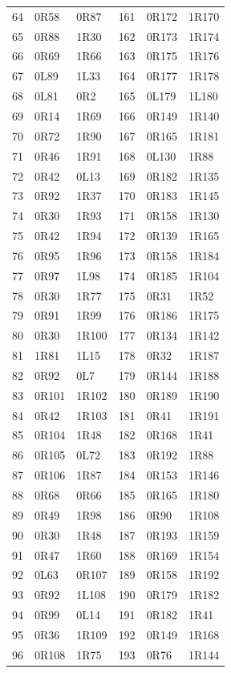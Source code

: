 {\begin{longtable}{@{}rll@{\qquad}rll@{}}
64 & 0R58 & 0R87 & 161 & 0R172 & 1R170\\
65 & 0R88 & 1R30 & 162 & 0R173 & 1R174\\
66 & 0R69 & 1R66 & 163 & 0R175 & 1R176\\
67 & 0L89 & 1L33 & 164 & 0R177 & 1R178\\
68 & 0L81 & 0R2 & 165 & 0L179 & 1L180\\
69 & 0R14 & 1R69 & 166 & 0R149 & 1R140\\
70 & 0R72 & 1R90 & 167 & 0R165 & 1R181\\
71 & 0R46 & 1R91 & 168 & 0L130 & 1R88\\
72 & 0R42 & 0L13 & 169 & 0R182 & 1R135\\
73 & 0R92 & 1R37 & 170 & 0R183 & 1R145\\
74 & 0R30 & 1R93 & 171 & 0R158 & 1R130\\
75 & 0R42 & 1R94 & 172 & 0R139 & 1R165\\
76 & 0R95 & 1R96 & 173 & 0R158 & 1R184\\
77 & 0R97 & 1L98 & 174 & 0R185 & 1R104\\
78 & 0R30 & 1R77 & 175 & 0R31 & 1R52\\
79 & 0R91 & 1R99 & 176 & 0R186 & 1R175\\
80 & 0R30 & 1R100 & 177 & 0R134 & 1R142\\
81 & 1R81 & 1L15 & 178 & 0R32 & 1R187\\
82 & 0R92 & 0L7 & 179 & 0R144 & 1R188\\
83 & 0R101 & 1R102 & 180 & 0R189 & 1R190\\
84 & 0R42 & 1R103 & 181 & 0R41 & 1R191\\
85 & 0R104 & 1R48 & 182 & 0R168 & 1R41\\
86 & 0R105 & 0L72 & 183 & 0R192 & 1R88\\
87 & 0R106 & 1R87 & 184 & 0R153 & 1R146\\
88 & 0R68 & 0R66 & 185 & 0R165 & 1R180\\
89 & 0R49 & 1R98 & 186 & 0R90 & 1R108\\
90 & 0R30 & 1R48 & 187 & 0R193 & 1R159\\
91 & 0R47 & 1R60 & 188 & 0R169 & 1R154\\
92 & 0L63 & 0R107 & 189 & 0R158 & 1R192\\
93 & 0R92 & 1L108 & 190 & 0R179 & 1R182\\
94 & 0R99 & 0L14 & 191 & 0R182 & 1R41\\
95 & 0R36 & 1R109 & 192 & 0R149 & 1R168\\
96 & 0R108 & 1R75 & 193 & 0R76 & 1R144\\
\bottomrule
\end{longtable}
}
